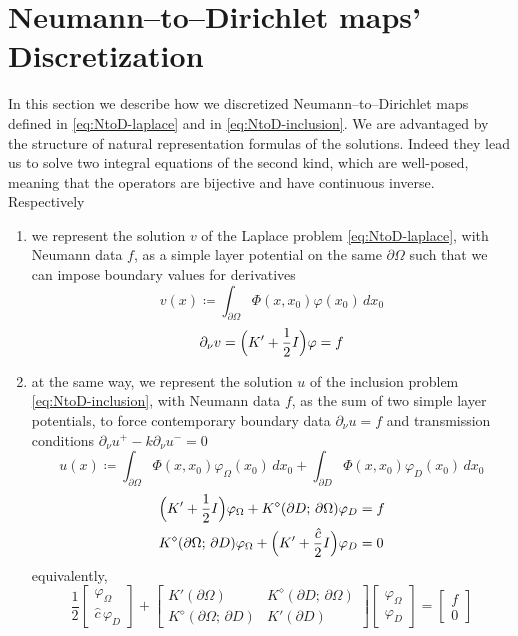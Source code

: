 \documentclass[10pt, a4paper, twoside, openright]{book}
\theoremstyle{definition}
\theoremstyle{plain}
\theoremstyle{plain}
\theoremstyle{plain}
\theoremstyle{plain}
\theoremstyle{plain}
\theoremstyle{plain}
\theoremstyle{plain}
\theoremstyle{plain}
\let\phi\varphi
\begin{document}
\section{Neumann--to--Dirichlet maps' Discretization}
In this section we describe how we discretized Neumann--to--Dirichlet maps defined in \eqref{eq:NtoD-laplace} and in \eqref{eq:NtoD-inclusion}. We are advantaged by the structure of natural representation formulas of the solutions. Indeed they lead us to solve two integral equations of the second kind, which are well-posed, meaning that the operators are bijective and have continuous inverse.
Respectively
\begin{enumerate}
 \item we represent the solution $v$ of the Laplace problem \eqref{eq:NtoD-laplace}, with Neumann data $f$, as a simple layer potential on the same $\partial \Omega$ such that we can impose boundary values for derivatives
 \begin{equation}
 \label{eq:def-v-representation}
  v(x)\coloneqq \int_{\partial\Omega}\Phi(x,x_0)\phi(x_0)\,dx_0
 \end{equation}
 \begin{equation}
 \label{eq:2kind-laplace}
  \partial_\nu v=\Bigl(K'+\dfrac{1}{2}I\Bigr)\phi = f
 \end{equation}
 \item at the same way, we represent the solution $u$ of the inclusion problem \eqref{eq:NtoD-inclusion}, with Neumann data $f$, as the sum of two simple layer potentials, to force contemporary boundary data $\partial_\nu u = f$ and transmission conditions $\partial_\nu u^+-k\partial_\nu u^-=0$
 \begin{equation}
 \label{eq:def-u-representation}
  u(x)\coloneqq \int_{\partial\Omega}\Phi(x,x_0)\phi_\Omega(x_0)\,dx_0 + \int_{\partial D}\Phi(x,x_0)\phi_D(x_0)\,dx_0
 \end{equation}
 \begin{align}
  &\Bigl(K' + \dfrac{1}{2} I\Bigr)\phi_\Omega + K^\diamond(\partial D;\,\partial \Omega)\phi_D = f\\
  & K^\diamond(\partial \Omega;\,\partial D)\phi_\Omega + \Bigl(K' + \dfrac{\hat{c}}{2} I\Bigr)\phi_D = 0
 \end{align}
 equivalently, 
 \begin{equation}
 \label{eq:2kind-inclusion}
 \dfrac{1}{2}
 \begin{bmatrix}
  \phi_\Omega\\ \hat{c}\,\phi_D
 \end{bmatrix}
 + 
 \begin{bmatrix}
 K'(\partial \Omega) & K^\diamond(\partial D;\,\partial \Omega)\\
 K^\diamond(\partial \Omega;\,\partial D) & K'(\partial D)
 \end{bmatrix}
 \begin{bmatrix}
  \phi_\Omega\\ \phi_D
 \end{bmatrix}
 =
 \begin{bmatrix}
 f\\ 0
 \end{bmatrix}
 \end{equation}
\end{enumerate}
\end{document}
